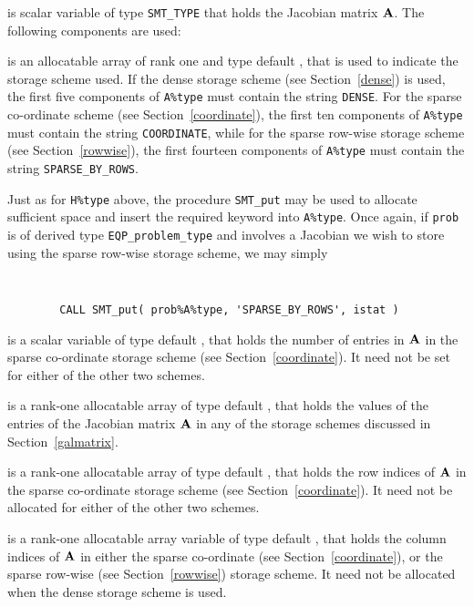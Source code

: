 \documentclass{galahad}
\newcommand{\packagename}{EQP}
\begin{document}
\begin{description}
 is scalar variable of type {\tt SMT\_TYPE} 
that holds the Jacobian matrix ${\mathbf{A}}$. The following components are used:

\begin{description}

 is an allocatable array of rank one and type default \character, that
is used to indicate the storage scheme used. If the dense storage scheme 
(see Section~\ref{dense}) is used, 
the first five components of {\tt A\%type} must contain the
string {\tt DENSE}.
For the sparse co-ordinate scheme (see Section~\ref{coordinate}), 
the first ten components of {\tt A\%type} must contain the
string {\tt COORDINATE}, while 
for the sparse row-wise storage scheme (see Section~\ref{rowwise}),
the first fourteen components of {\tt A\%type} must contain the
string {\tt SPARSE\_BY\_ROWS}.

Just as for {\tt H\%type} above, the procedure {\tt SMT\_put} 
may be used to allocate sufficient space and insert the required keyword
into {\tt A\%type}.
Once again, if {\tt prob} is of derived type {\tt \packagename\_problem\_type}
and involves a Jacobian we wish to store using the sparse row-wise 
storage scheme, we may simply
{\tt 
\begin{verbatim}
        CALL SMT_put( prob%A%type, 'SPARSE_BY_ROWS', istat )
\end{verbatim}
}
\noindent

 is a scalar variable of type default \integer, that 
holds the number of entries in ${\mathbf{A}}$
in the sparse co-ordinate storage scheme (see Section~\ref{coordinate}). 
It need not be set for either of the other two schemes.

 is a rank-one allocatable array of type default \realdp, that holds
the values of the entries of the Jacobian matrix ${\mathbf{A}}$ in any of the 
storage schemes discussed in Section~\ref{galmatrix}.

 is a rank-one allocatable array of type default \integer,
that holds the row indices of ${\mathbf{A}}$ in the sparse co-ordinate storage
scheme (see Section~\ref{coordinate}). 
It need not be allocated for either of the other two schemes.

 is a rank-one allocatable array variable of type default \integer,
that holds the column indices of ${\mathbf{A}}$ in either the sparse co-ordinate 
(see Section~\ref{coordinate}), or the sparse row-wise 
(see Section~\ref{rowwise}) storage scheme.
It need not be allocated when the dense storage scheme is used.


\end{description}
\end{description}
\end{document}

